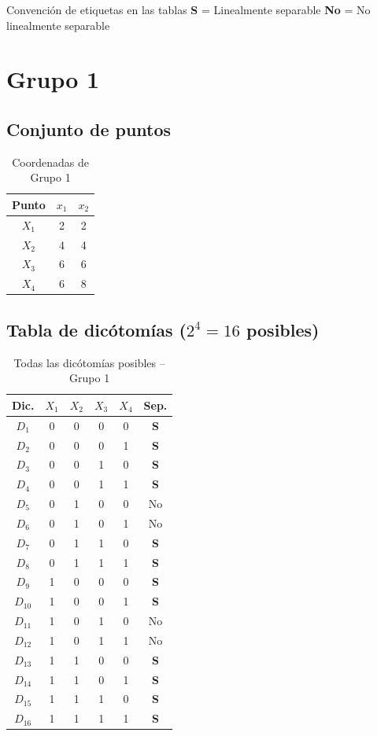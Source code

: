 \documentclass[12pt,a4paper]{article}
\begin{document}
\begin{cajainfo}{Convenci\'on de etiquetas en las tablas}
\textbf{S} = Linealmente separable \quad \textbf{No} = No linealmente separable
\end{cajainfo}

\section{Grupo 1}
\subsection{Conjunto de puntos}
\begin{table}[H]\centering
  \caption{Coordenadas de Grupo 1}
  \begin{tabular}{ccc}\toprule
    \textbf{Punto} & \textbf{$x_1$} & \textbf{$x_2$}\\\midrule
    $X_{1}$ & 2 & 2 \\
    $X_{2}$ & 4 & 4 \\
    $X_{3}$ & 6 & 6 \\
    $X_{4}$ & 6 & 8 \\
  \bottomrule\end{tabular}
\end{table}

\subsection{Tabla de dic\'otom\'ias ($2^{4}=16$ posibles)}
\begin{table}[H]\centering
  \caption{Todas las dic\'otom\'ias posibles -- Grupo 1}
  \begin{tabular}{cccccc}\toprule
    \textbf{Dic.} & $X_{1}$ & $X_{2}$ & $X_{3}$ & $X_{4}$ & \textbf{Sep.}\\\midrule
    $D_{1}$ & 0 & 0 & 0 & 0 & \textbf{S} \\
    $D_{2}$ & 0 & 0 & 0 & 1 & \textbf{S} \\
    $D_{3}$ & 0 & 0 & 1 & 0 & \textbf{S} \\
    $D_{4}$ & 0 & 0 & 1 & 1 & \textbf{S} \\
    $D_{5}$ & 0 & 1 & 0 & 0 & No \\
    $D_{6}$ & 0 & 1 & 0 & 1 & No \\
    $D_{7}$ & 0 & 1 & 1 & 0 & \textbf{S} \\
    $D_{8}$ & 0 & 1 & 1 & 1 & \textbf{S} \\
    $D_{9}$ & 1 & 0 & 0 & 0 & \textbf{S} \\
    $D_{10}$ & 1 & 0 & 0 & 1 & \textbf{S} \\
    $D_{11}$ & 1 & 0 & 1 & 0 & No \\
    $D_{12}$ & 1 & 0 & 1 & 1 & No \\
    $D_{13}$ & 1 & 1 & 0 & 0 & \textbf{S} \\
    $D_{14}$ & 1 & 1 & 0 & 1 & \textbf{S} \\
    $D_{15}$ & 1 & 1 & 1 & 0 & \textbf{S} \\
    $D_{16}$ & 1 & 1 & 1 & 1 & \textbf{S} \\
  \bottomrule\end{tabular}
\end{table}
\end{document}
